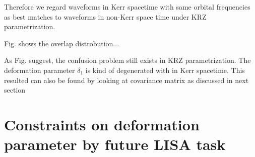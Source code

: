 \documentclass{article}
\begin{document}
Therefore we regard waveforms in Kerr spacetime with same orbital frequencies as best matches to waveforms in non-Kerr space time under KRZ parametrization.

Fig. shows the overlap distrobution...

As Fig. suggest, the confusion problem still exists in KRZ parametrization. The deformation parameter $\delta_1$ is kind of degenerated with   in Kerr spacetime. This resulted can also be found by looking at covariance matrix as discussed in next section
\section{Constraints on deformation parameter by future LISA task}



\end{document}
